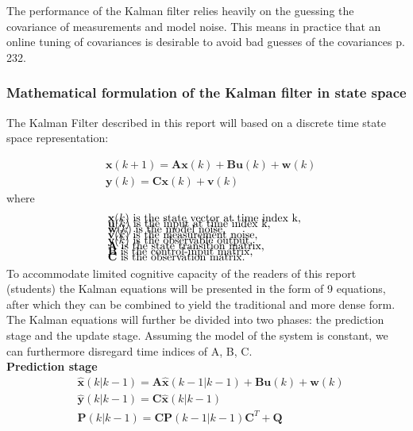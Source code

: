 The performance of the Kalman filter relies heavily on the guessing the covariance of measurements and model noise. This means in practice that an online tuning of covariances is desirable to avoid bad guesses of the covariances \cite{Doraiswami2014} p. 232.

\subsubsection{Mathematical formulation of the Kalman filter in state space}
The Kalman Filter described in this report will based on a discrete time state space representation: 

\begin{align}
	&\textbf{x}(k+1) = \textbf{A}\textbf{x}(k) + \textbf{B}\textbf{u}(k) + \textbf{w}(k)  \label{eq:KalmanSystemEquations} \\
	&\textbf{y}(k) = \textbf{C}\textbf{x}(k)+\textbf{v}(k) 
\end{align}
where 
\begin{align*}
	&\text{$\textbf{x}(k)$ is the state vector at time index k,	}	\\[-1em]
	&\text{$\textbf{u}(k)$ is the input at time index k, 		}	\\[-1em]
	&\text{$\textbf{w}(k)$ is the model noise,					}	\\[-1em]
	&\text{$\textbf{v}(k)$ is the measurement noise,				}	\\[-1em]
	&\text{$\textbf{y}(k)$ is the observable output, 			}	\\[-1em]
	&\text{\textbf{A} is the state transition matrix,			}	\\[-1em]
	&\text{\textbf{B} is the control-input matrix,				}	\\[-1em]
	&\text{\textbf{C} is the observation matrix. 				}	\\[-1em]
\end{align*}

To accommodate limited cognitive capacity of the readers of this report (students) the Kalman equations will be presented in the form of 9 equations, after which they can be combined to yield the traditional and more dense form.
The Kalman equations will further be divided into two phases: the prediction stage and the update stage. Assuming the model of the system is constant, we can furthermore disregard time indices of A, B, C.\\
\textbf{Prediction stage}
\begin{align}
	&\hat{\textbf{x}}(k|k-1) = \textbf{A} \hat{\textbf{x}}(k-1|k-1) + \textbf{B}\textbf{u}(k) + \textbf{w}(k) 	\label{eq:Kalman_pred_state} 	\\
	&\hat{\textbf{y}}(k|k-1) = \textbf{C}\hat{\textbf{x}}(k|k-1)												\label{eq:Kalman_pred_output} 	\\
	&\textbf{P}(k|k-1) = \textbf{C}\textbf{P}(k-1|k-1)\textbf{C}^T+\textbf{Q} 								\label{eq:Kalman_pred_cov} 		
\end{align}

